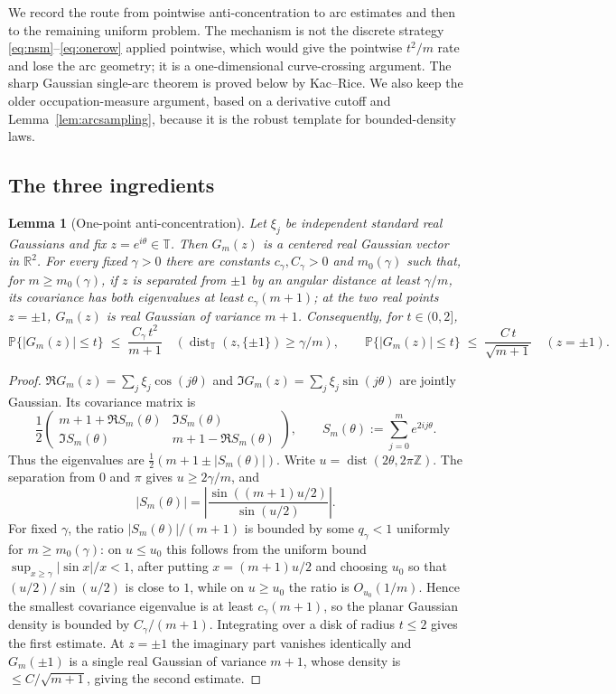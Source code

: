 \documentclass[11pt]{amsart}
\numberwithin{equation}{section}
\newtheorem{lemma}[theorem]{Lemma}
\theoremstyle{definition}
\theoremstyle{remark}
\newcommand{\R}{\mathbb R}
\newcommand{\Z}{\mathbb Z}
\newcommand{\T}{\mathbb T}
\newcommand{\Prob}{\mathbb P}
\newcommand{\abs}[1]{\left\lvert #1\right\rvert}
\begin{document}
We record the route from pointwise anti-concentration to arc estimates and then
to the remaining uniform problem.  The mechanism is not the discrete strategy
\eqref{eq:nsm}--\eqref{eq:onerow} applied pointwise, which would give the
pointwise \(t^2/m\) rate and lose the arc geometry; it is a one-dimensional
curve-crossing argument.  The sharp Gaussian single-arc theorem is proved below
by Kac--Rice.  We also keep the older occupation-measure argument, based on a
derivative cutoff and Lemma~\ref{lem:arcsampling}, because it is the robust
template for bounded-density laws.

\subsection{The three ingredients}

\begin{lemma}[One-point anti-concentration]\label{lem:onepoint}
Let $\xi_j$ be independent standard real Gaussians and fix $z=e^{i\theta}\in\T$. Then \(G_m(z)\) is a centered real Gaussian vector in \(\R^2\). For every fixed \(\gamma>0\) there are constants \(c_\gamma,C_\gamma>0\) and \(m_0(\gamma)\) such that, for \(m\ge m_0(\gamma)\), if \(z\) is separated from \(\pm1\) by an angular distance at least \(\gamma/m\), its covariance has both eigenvalues at least \(c_\gamma(m+1)\); at the two real points \(z=\pm1\), \(G_m(z)\) is real Gaussian of variance \(m+1\). Consequently, for \(t\in(0,2]\),
\[
  \Prob\{\abs{G_m(z)}\le t\}\;\le\;\frac{C_\gamma\,t^2}{m+1}\quad(\operatorname{dist}_\T(z,\{\pm1\})\ge\gamma/m),
  \qquad
  \Prob\{\abs{G_m(z)}\le t\}\;\le\;\frac{C\,t}{\sqrt{m+1}}\quad(z=\pm1).
\]
\end{lemma}

\begin{proof}
$\Re G_m(z)=\sum_j\xi_j\cos(j\theta)$ and $\Im G_m(z)=\sum_j\xi_j\sin(j\theta)$ are jointly Gaussian. Its covariance matrix is
\[
  \frac12
  \begin{pmatrix}
    m+1+\Re S_m(\theta) & \Im S_m(\theta)\\
    \Im S_m(\theta) & m+1-\Re S_m(\theta)
  \end{pmatrix},
  \qquad
  S_m(\theta):=\sum_{j=0}^m e^{2ij\theta}.
\]
Thus the eigenvalues are \(\frac12(m+1\pm |S_m(\theta)|)\). Write
\(u=\operatorname{dist}(2\theta,2\pi\Z)\). The separation from \(0\) and
\(\pi\) gives \(u\ge 2\gamma/m\), and
\[
  |S_m(\theta)|
  =\left|\frac{\sin((m+1)u/2)}{\sin(u/2)}\right|.
\]
For fixed \(\gamma\), the ratio \(|S_m(\theta)|/(m+1)\) is bounded by some
\(q_\gamma<1\) uniformly for \(m\ge m_0(\gamma)\): on \(u\le u_0\) this follows
from the uniform bound \(\sup_{x\ge\gamma}|\sin x|/x<1\), after putting
\(x=(m+1)u/2\) and choosing \(u_0\) so that \((u/2)/\sin(u/2)\) is close to
\(1\), while on \(u\ge u_0\) the ratio is \(O_{u_0}(1/m)\). Hence the
smallest covariance eigenvalue is at least \(c_\gamma(m+1)\), so the planar
Gaussian density is bounded by \(C_\gamma/(m+1)\). Integrating over a disk of
radius \(t\le2\) gives the first estimate. At \(z=\pm1\) the imaginary part
vanishes identically and \(G_m(\pm1)\) is a single real Gaussian of variance
\(m+1\), whose density is \(\le C/\sqrt{m+1}\), giving the second estimate.
\end{proof}
\end{document}

